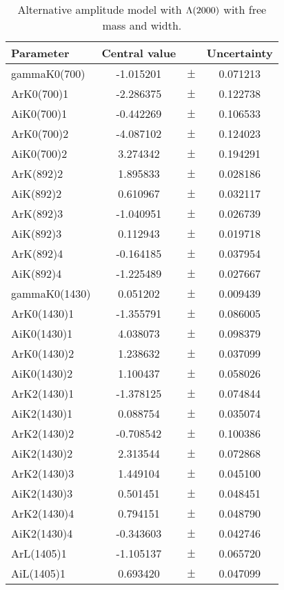 \clearpage

\begin{table}
\centering
\caption{Alternative amplitude model with ${\Lambda}(2000)$ with free mass and width.}
\begin{tiny}
\begin{tabular}{lccc}
\toprule
Parameter & Central value & & Uncertainty\\
\midrule 
gammaK0(700) & -1.015201 & $\pm$ & 0.071213 \\
ArK0(700)1 & -2.286375 & $\pm$ & 0.122738 \\
AiK0(700)1 & -0.442269 & $\pm$ & 0.106533 \\
ArK0(700)2 & -4.087102 & $\pm$ & 0.124023 \\
AiK0(700)2 & 3.274342 & $\pm$ & 0.194291 \\
ArK(892)2 & 1.895833 & $\pm$ & 0.028186 \\
AiK(892)2 & 0.610967 & $\pm$ & 0.032117 \\
ArK(892)3 & -1.040951 & $\pm$ & 0.026739 \\
AiK(892)3 & 0.112943 & $\pm$ & 0.019718 \\
ArK(892)4 & -0.164185 & $\pm$ & 0.037954 \\
AiK(892)4 & -1.225489 & $\pm$ & 0.027667 \\
gammaK0(1430) & 0.051202 & $\pm$ & 0.009439 \\
ArK0(1430)1 & -1.355791 & $\pm$ & 0.086005 \\
AiK0(1430)1 & 4.038073 & $\pm$ & 0.098379 \\
ArK0(1430)2 & 1.238632 & $\pm$ & 0.037099 \\
AiK0(1430)2 & 1.100437 & $\pm$ & 0.058026 \\
ArK2(1430)1 & -1.378125 & $\pm$ & 0.074844 \\
AiK2(1430)1 & 0.088754 & $\pm$ & 0.035074 \\
ArK2(1430)2 & -0.708542 & $\pm$ & 0.100386 \\
AiK2(1430)2 & 2.313544 & $\pm$ & 0.072868 \\
ArK2(1430)3 & 1.449104 & $\pm$ & 0.045100 \\
AiK2(1430)3 & 0.501451 & $\pm$ & 0.048451 \\
ArK2(1430)4 & 0.794151 & $\pm$ & 0.048790 \\
AiK2(1430)4 & -0.343603 & $\pm$ & 0.042746 \\
ArL(1405)1 & -1.105137 & $\pm$ & 0.065720 \\
AiL(1405)1 & 0.693420 & $\pm$ & 0.047099 \\

\end{tabular}
\end{tiny}
\end{table}
